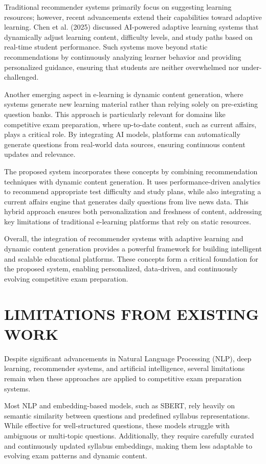 \begin{sloppypar}
Traditional recommender systems primarily focus on suggesting learning resources; however, recent advancements extend their capabilities toward adaptive learning. Chen et al. (2025) \cite{chen2025adaptive} discussed AI-powered adaptive learning systems that dynamically adjust learning content, difficulty levels, and study paths based on real-time student performance. Such systems move beyond static recommendations by continuously analyzing learner behavior and providing personalized guidance, ensuring that students are neither overwhelmed nor under-challenged.

Another emerging aspect in e-learning is dynamic content generation, where systems generate new learning material rather than relying solely on pre-existing question banks. This approach is particularly relevant for domains like competitive exam preparation, where up-to-date content, such as current affairs, plays a critical role. By integrating AI models, platforms can automatically generate questions from real-world data sources, ensuring continuous content updates and relevance.

The proposed system incorporates these concepts by combining recommendation techniques with dynamic content generation. It uses performance-driven analytics to recommend appropriate test difficulty and study plans, while also integrating a current affairs engine that generates daily questions from live news data. This hybrid approach ensures both personalization and freshness of content, addressing key limitations of traditional e-learning platforms that rely on static resources.

Overall, the integration of recommender systems with adaptive learning and dynamic content generation provides a powerful framework for building intelligent and scalable educational platforms. These concepts form a critical foundation for the proposed system, enabling personalized, data-driven, and continuously evolving competitive exam preparation.

\section{\MakeUppercase{LIMITATIONS FROM EXISTING WORK}}

Despite significant advancements in Natural Language Processing (NLP), deep learning, recommender systems, and artificial intelligence, several limitations remain when these approaches are applied to competitive exam preparation systems.

Most NLP and embedding-based models, such as SBERT, rely heavily on semantic similarity between questions and predefined syllabus representations. While effective for well-structured questions, these models struggle with ambiguous or multi-topic questions. Additionally, they require carefully curated and continuously updated syllabus embeddings, making them less adaptable to evolving exam patterns and dynamic content.


\end{sloppypar}
